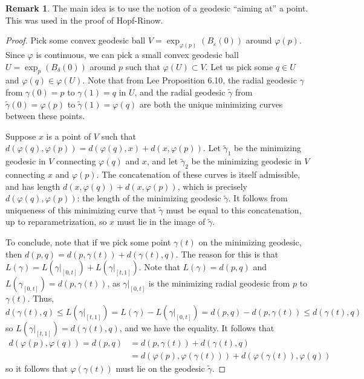 \documentclass[aps,pra,showpacs,notitlepage,onecolumn,superscriptaddress,nofootinbib]{revtex4-1}
\theoremstyle{definition}
\newtheorem{remark}{Remark}[section]
\begin{document}
\begin{remark}
  The main idea is to use the notion of a geodesic ``aiming at'' a point. This was used in the proof of Hopf-Rinow.
  \end{remark}

\begin{proof}
  Pick some convex geodesic ball $V = \exp_{\varphi(p)}(B_{\varepsilon}(0))$ around $\varphi(p)$. Since $\varphi$ is continuous, we can pick a small convex geodesic ball $U = \exp_{p}(B_{\delta}(0))$ around
  $p$ such that $\varphi(U) \subset V$. Let us pick some $q \in U$ and $\varphi(q) \in \varphi(U)$. Note that from Lee Proposition 6.10, the radial geodesic $\gamma$ from $\gamma(0) = p$ to $\gamma(1) = q$ in $U$,
  and the radial geodesic $\widetilde{\gamma}$ from $\widetilde{\gamma}(0) = \varphi(p)$ to $\widetilde{\gamma}(1) = \varphi(q)$ are both the unique minimizing curves between these points.
  \newline

  \noindent Suppose $x$ is a point of $V$ such that $d(\varphi(q), \varphi(p)) = d(\varphi(q), x) + d(x, \varphi(p))$. Let $\widetilde{\gamma}_1$ be the minimizing geodesic in $V$ connecting $\varphi(q)$
  and $x$, and let $\widetilde{\gamma}_2$ be the minimizing geodesic in $V$ connecting $x$ and $\varphi(p)$. The concatenation of these curves is itself admissible, and has length $d(x, \varphi(q)) + d(x, \varphi(p))$,
  which is precisely $d(\varphi(q), \varphi(p))$: the length of the minimizing geodesic $\widetilde{\gamma}$. It follows from uniqueness of this minimizing curve that $\widetilde{\gamma}$ must be equal to
  this concatenation, up to reparametrization, so $x$ must lie in the image of $\widetilde{\gamma}$.
  \newline

  \noindent To conclude, note that if we pick some point $\gamma(t)$ on the minimizing geodesic, then $d(p, q) = d(p, \gamma(t)) + d(\gamma(t), q)$. The reason for this is that $L(\gamma) = L(\gamma|_{[0, t]}) + L(\gamma|_{[t, 1]})$.
  Note that $L(\gamma) = d(p, q)$ and $L(\gamma_{[0, t]}) = d(p, \gamma(t))$, as $\gamma|_{[0, t]}$ is the minimizing radial geodesic from $p$ to $\gamma(t)$. Thus,
  \begin{equation}
    d(\gamma(t), q) \leq L(\gamma|_{[t, 1]}) = L(\gamma) - L(\gamma|_{[0, t]}) = d(p, q) - d(p, \gamma(t)) \leq d(\gamma(t), q)
  \end{equation}
  so $L(\gamma|_{[t, 1]}) = d(\gamma(t), q)$, and we have the equality. It follows that
  \begin{align}
    d(\varphi(p), \varphi(q)) = d(p, q) &= d(p, \gamma(t)) + d(\gamma(t), q)
    \\ &= d(\varphi(p), \varphi(\gamma(t)) ) + d(\varphi(\gamma(t)), \varphi(q))
  \end{align}
  so it follows that $\varphi(\gamma(t))$ must lie on the geodesic $\widetilde{\gamma}$.
  \newline


\end{proof}
\end{document}
